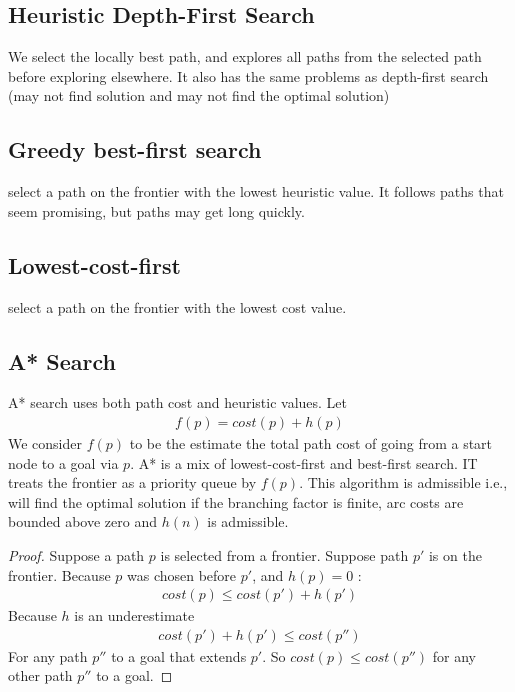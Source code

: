 \documentclass[a4paper]{article}
\theoremstyle{plain}
\theoremstyle{definition}
\theoremstyle{remark}
\begin{document}
\subsection{Heuristic Depth-First Search}
We select the locally best path, and explores all paths from the selected path before exploring elsewhere. It also has the same problems as depth-first search (may not find solution and may not find the optimal solution)
\subsection{Greedy best-first search}
select a path on the frontier with the lowest heuristic value. It follows paths that seem promising, but paths may get long quickly. 
\subsection{Lowest-cost-first}
select a path on the frontier with the lowest cost value.
\subsection{A* Search}
A* search uses both path cost and heuristic values. Let
\begin{align*}
	f(p) = cost(p)+h(p)
\end{align*}
We consider $f(p)$ to be the estimate the total path cost of going from a start node to a goal via $p$. A* is a mix of lowest-cost-first and best-first search. IT treats the frontier as a priority queue by $f(p)$. This algorithm is admissible i.e., will find the optimal solution if the branching factor is finite, arc costs are bounded above zero and $h(n)$ is admissible.
\begin{proof}
	Suppose a path $p$ is selected from a frontier. Suppose path $p'$ is on the frontier. Because $p$ was chosen before $p'$, and $h(p) =0$ :
	\begin{align*}
		cost(p) \le cost(p')+h(p')
	\end{align*}
Because $h$ is an underestimate
\begin{align*}
	cost(p')+h(p')\le cost(p'')
\end{align*}
For any path $p''$ to a goal that extends $p'$. So $cost(p)\le cost(p'')$ for any other path $p''$ to a goal.
\end{proof}
\end{document}
